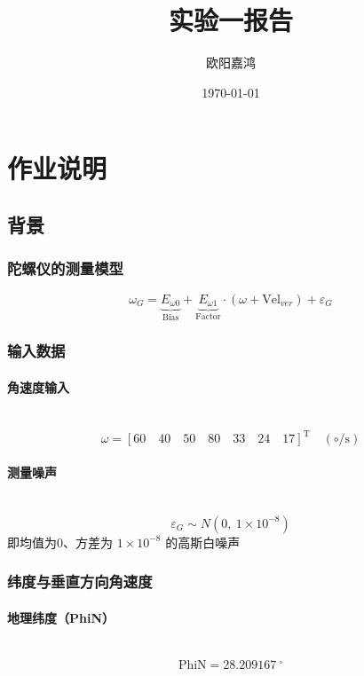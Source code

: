 \documentclass[openany,12pt,UTF8]{ctexart}
\title{实验一报告}
\author{欧阳嘉鸿}
\date{\today}
\begin{document}
\maketitle
\newpage
\tableofcontents
\newpage

\section{作业说明}
\subsection{背景}
\subsubsection{陀螺仪的测量模型}
\begin{equation}
    \label{equation:陀螺仪的测量模型}
    \omega_{G} = \underbrace{E_{\omega 0}}_{\text{Bias}} + \underbrace{E_{\omega 1}}_{\text{Factor}} \cdot (\omega + \text{Vel}_{ver}) + \varepsilon_{G}
\end{equation}

\subsubsection{输入数据}
\paragraph{角速度输入}\
\begin{equation}
    \omega = [60\quad 40\quad 50\quad 80\quad 33\quad 24\quad 17]^{\text{T}} \quad (\circ/\text{s})
\end{equation}

\paragraph{测量噪声}\
\begin{equation}
    \varepsilon_{G} \sim N(0,\ 1 \times 10^{-8})
\end{equation}
即均值为0、方差为 $1 \times 10^{-8}$ 的高斯白噪声

\subsubsection{纬度与垂直方向角速度}
\paragraph{地理纬度（PhiN）}\
\begin{equation}
    \text{PhiN} = 28.209167\ ^\circ
\end{equation}
\end{document}
